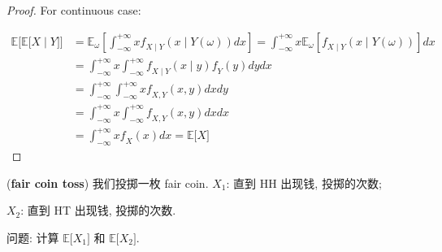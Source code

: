 \begin{proof}
For continuous case:

\[\begin{matrix}
{\mathbb{E}\lbrack\mathbb{E}\lbrack\mathit{X} \mid \mathit{Y}\rbrack\rbrack} & {= \mathbb{E}_{\mathit{\omega}}\left\lbrack {\int_{- \infty}^{+ \infty}\mathit{x}\mathit{f}_{\mathit{X} \mid \mathit{Y}}(\mathit{x} \mid \mathit{Y}(\mathit{\omega}))\mathit{d}\mathit{x}} \right\rbrack = \int_{- \infty}^{+ \infty}\mathit{x}\mathbb{E}_{\mathit{\omega}}\left\lbrack {\mathit{f}_{\mathit{X} \mid \mathit{Y}}(\mathit{x} \mid \mathit{Y}(\mathit{\omega}))} \right\rbrack\mathit{d}\mathit{x}} \\
 & {= \int_{- \infty}^{+ \infty}\mathit{x}\int_{- \infty}^{+ \infty}\mathit{f}_{\mathit{X} \mid \mathit{Y}}(\mathit{x} \mid \mathit{y})\mathit{f}_{\mathit{Y}}(\mathit{y})\mathit{d}\mathit{y}\mathit{d}\mathit{x}} \\
 & {= \int_{- \infty}^{+ \infty}\int_{- \infty}^{+ \infty}\mathit{x}\mathit{f}_{\mathit{X},\mathit{Y}}(\mathit{x},\mathit{y})\mathit{d}\mathit{x}\mathit{d}\mathit{y}} \\
 & {= \int_{- \infty}^{+ \infty}\mathit{x}\int_{- \infty}^{+ \infty}\mathit{f}_{\mathit{X},\mathit{Y}}(\mathit{x},\mathit{y})\mathit{d}\mathit{x}\mathit{d}\mathit{x}} \\
 & {= \int_{- \infty}^{+ \infty}\mathit{x}\mathit{f}_{\mathit{X}}(\mathit{x})\mathit{d}\mathit{x} = \mathbb{E}\lbrack\mathit{X}\rbrack}
\end{matrix}\]

\end{proof}

\begin{example}

(\textbf{fair coin toss}) 我们投掷一枚 fair coin. \(\mathit{X}_{1}\): 直到 HH 出现钱, 投掷的次数;

\(\mathit{X}_{2}\): 直到 HT 出现钱, 投掷的次数.

问题: 计算 \(\mathbb{E}\lbrack\mathit{X}_{1}\rbrack\) 和 \(\mathbb{E}\lbrack\mathit{X}_{2}\rbrack\).

\end{example}

